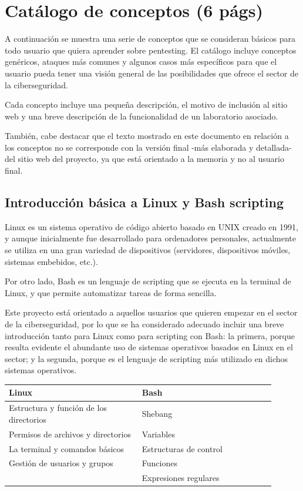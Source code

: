             \newpage
        
        
\chapter{Catálogo de conceptos (6 págs)}
    \label{sec:catalogo}

    A continuación se muestra una serie de conceptos que se consideran básicos para todo usuario que quiera aprender sobre pentesting. El catálogo incluye conceptos genéricos, ataques más comunes y algunos casos más específicos para que el usuario pueda tener una visión general de las posibilidades que ofrece el sector de la ciberseguridad.

    Cada concepto incluye una pequeña descripción, el motivo de inclusión al sitio web y una breve descripción de la funcionalidad de un laboratorio asociado.

    También, cabe destacar que el texto mostrado en este documento en relación a los conceptos no se corresponde con la versión final -más elaborada y detallada- del sitio web del proyecto, ya que está orientado a la memoria y no al usuario final.

    \section{Introducción básica a Linux y Bash scripting}
        \label{sec:catalogo-linux-bash}

        Linux es un sistema operativo de código abierto basado en UNIX creado en 1991, y aunque inicialmente fue desarrollado para ordenadores personales, actualmente se utiliza en una gran variedad de dispositivos (servidores, dispositivos móviles, sistemas embebidos, etc.).

        Por otro lado, Bash es un lenguaje de scripting que se ejecuta en la terminal de Linux, y que permite automatizar tareas de forma sencilla.

        Este proyecto está orientado a aquellos usuarios que quieren empezar en el sector de la ciberseguridad, por lo que se ha considerado adecuado incluir una breve introducción tanto para Linux como para scripting con Bash: la primera, porque resulta evidente el abundante uso de sistemas operativos basados en Linux en el sector; y la segunda, porque es el lenguaje de scripting más utilizado en dichos sistemas operativos.

        \begin{tabular}{|m{0.45\linewidth}|m{0.45\linewidth}|}                
            \hline
            \textbf{Linux} & \textbf{Bash} \\
            \hline
            Estructura y función de los directorios & Shebang \\
            Permisos de archivos y directorios & Variables \\
            La terminal y comandos básicos & Estructuras de control \\
            Gestión de usuarios y grupos & Funciones \\
            & Expresiones regulares \\
            \hline
        \end{tabular}

